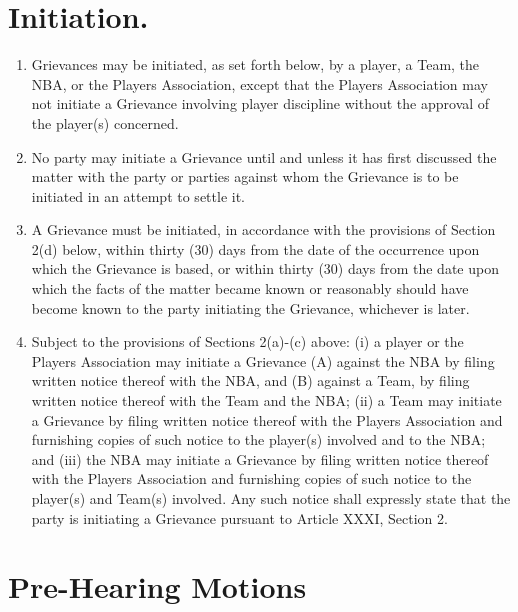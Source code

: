 \documentclass[
]{book}
\providecommand{\tightlist}{%
  \setlength{\itemsep}{0pt}\setlength{\parskip}{0pt}}
\begin{document}
\hypertarget{initiation.}{%
\section{Initiation.}\label{initiation.}}

\begin{enumerate}
\def\labelenumi{(\alph{enumi})}
\tightlist
\item
  Grievances may be initiated, as set forth below, by a player, a Team, the NBA, or the Players Association, except that the Players Association may not initiate a Grievance involving player discipline without the approval of the player(s) concerned.
\item
  No party may initiate a Grievance until and unless it has first discussed the matter with the party or parties against whom the Grievance is to be initiated in an attempt to settle it.
\item
  A Grievance must be initiated, in accordance with the provisions of Section 2(d) below, within thirty (30) days from the date of the occurrence upon which the Grievance is based, or within thirty (30) days from the date upon which the facts of the matter became known or reasonably should have become known to the party initiating the Grievance, whichever is later.
\item
  Subject to the provisions of Sections 2(a)-(c) above: (i) a player or the Players Association may initiate a Grievance (A) against the NBA by filing written notice thereof with the NBA, and (B) against a Team, by filing written notice thereof with the Team and the NBA; (ii) a Team may initiate a Grievance by filing written notice thereof with the Players Association and furnishing copies of such notice to the player(s) involved and to the NBA; and (iii) the NBA may initiate a Grievance by filing written notice thereof with the Players Association and furnishing copies of such notice to the player(s) and Team(s) involved. Any such notice shall expressly state that the party is initiating a Grievance pursuant to Article XXXI, Section 2.
\end{enumerate}

\hypertarget{pre-hearing-motions}{%
\section{Pre-Hearing Motions}\label{pre-hearing-motions}}
\end{document}
